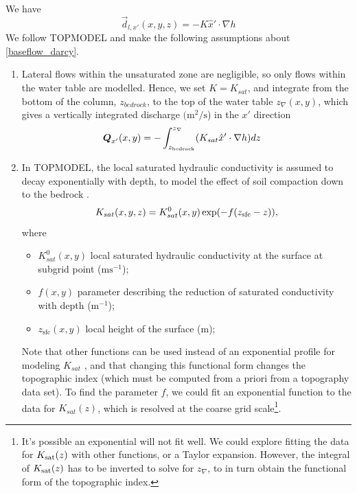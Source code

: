 \documentclass[twoside,10pt]{report}
\begin{document}
\noindent We have
\begin{equation}\label{baseflow_darcy}
    \vec{d}_{l,x'}(x,y,z)=-K \hat{x}'\cdot \nabla h  
\end{equation}
We follow TOPMODEL and make the following assumptions about \ref{baseflow_darcy}. 
\begin{enumerate}
    \item Lateral flows within the unsaturated zone are negligible, so only flows within the water table are modelled. Hence, we set $K=K_{sat}$, and integrate from the bottom of the column, $z_{bedrock}$, to the top of the water table $z_{\nabla}(x,y)$, which gives a vertically integrated discharge $\mathrm{(m^2/s}$)  in the $x'$ direction 
    \begin{align} 
   \vec{Q}_{x'}(x, y)&=-\int_{z_{\rm bedrock}}^{z_{\nabla}}(K_{sat}\hat{x}'\cdot\nabla h) dz
    \label{qlx}
    \end{align}
    \item In TOPMODEL, the local saturated hydraulic conductivity is assumed to decay exponentially with depth, to model the effect of soil compaction down to the bedrock \citep{Ambroise96}. 
    \begin{equation}
        K_{sat}(x, y, z)=K_{sat}^0(x, y) \exp(-f (z_{\rm sfc}- z)),
        \label{Ksat}
    \end{equation}
    where
    \begin{itemize}
    \item $K_{sat}^0(x, y)$ local saturated hydraulic conductivity at the surface at subgrid point ($\mathrm{ms^{-1}}$);
    \item $f(x, y)$ parameter describing the reduction of saturated conductivity with depth ($\mathrm{m^{-1}}$);
    \item $z_{\mathrm{sfc}}(x, y)$ local height of the surface ($\mathrm{m}$);
    \end{itemize}
   Note that other functions can be used instead of an exponential profile for modeling $K_{sat}$ \citep{Ambroise96}, and that changing this functional form changes the topographic index (which must be computed from a priori from a topography data set). To find the parameter $f$, we could fit an exponential function to the data for $K_{sat}(z)$, which is resolved at the coarse grid scale\footnote{It's possible an exponential will not fit well. We could explore fitting the data for $K_{\rm sat}(z)$ with other functions, or a Taylor expansion. However, the integral of $K_{\rm sat}(z)$ has to be inverted to solve for $z_\nabla$, to in turn obtain the functional form of the topographic index.}.

\end{enumerate}
\end{document}
